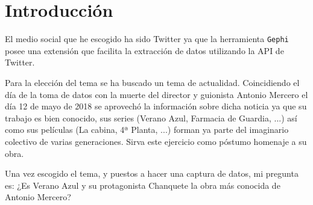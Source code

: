 \chapter{Introducción}

El medio social que he escogido ha sido Twitter ya que la herramienta \texttt{Gephi} posee una extensión que facilita la extracción de datos utilizando la API de Twitter.

\bigskip
Para la elección del tema se ha buscado un tema de actualidad. Coincidiendo el día de la toma de datos con la muerte del director y guionista Antonio Mercero el día 12 de mayo de 2018 se aprovechó la información sobre dicha noticia ya que su trabajo es bien conocido, sus series (Verano Azul, Farmacia de Guardia, ...) así como sus películas (La cabina, 4ª Planta, ...) forman ya parte del imaginario colectivo de varias generaciones. Sirva este ejercicio como póstumo homenaje a su obra.

\bigskip
Una vez escogido el tema, y puestos a hacer una captura de datos, mi pregunta es: ¿Es Verano Azul y su protagonista Chanquete la obra más conocida de Antonio Mercero?